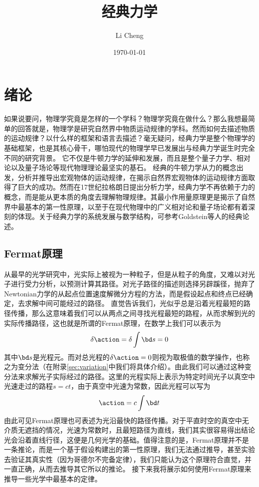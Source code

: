 \documentclass[12pt,openany]{book}
\title{经典力学}
\author{Li Cheng}
\date{\today}
\begin{document}
\maketitle
\frontmatter
\tableofcontents
\mainmatter

\chapter{绪论}
\label{chap:intro}
如果说要问，物理学究竟是怎样的一个学科？物理学究竟在做什么？那么我想最简单的回答就是，物理学是研究自然界中物质运动规律的学科。然而如何去描述物质的运动规律？以什么样的框架和语言去描述？毫无疑问，经典力学是整个物理学的基础框架，也是其核心骨干，哪怕现代的物理学早已发展出与经典力学诞生时完全不同的研究背景。
它不仅是牛顿力学的延伸和发展，而且是整个量子力学、相对论以及量子场论等现代物理理论最坚实的基石。
经典的牛顿力学从力的概念出发，分析并推导出宏观物体的运动规律，在揭示自然界宏观物体的运动规律方面取得了巨大的成功。然而在17世纪拉格朗日提出分析力学，经典力学不再依赖于力的概念，而是能从更本质的角度去理解物理规律。其最小作用量原理更是揭示了自然界中最基本的第一性原理，以至于在现代物理中的广义相对论和量子场论都有着深刻的体现。关于经典力学的系统发展与数学结构，可参考Goldstein等人的经典论述\cite{landau1976, goldstein2002}。


\section{Fermat原理}
\label{sec:fermat}

从最早的光学研究中，光实际上被视为一种粒子，但是从粒子的角度，又难以对光子进行受力分析，以预测计算其路径。对光子路径的描述则选择另辟蹊径，抛弃了Newtonian力学的从起点位置速度解微分方程的方法，而是假设起点和终点已经确定，去求解中间可能经过的路径。
直觉告诉我们，光似乎总是沿着光程最短的路径传播，那么这意味着我们可以从两点之间寻找光程最短的路程，从而求解到光的实际传播路径，这也就是所谓的Fermat原理，在数学上我们可以表示为
\begin{equation}
   \delta \action = \delta \int \bd s =0\label{eq:fermat}
\end{equation}
其中\(\bd s\)是光程元。而对总光程的$\delta\action=0$则视为取极值的数学操作，也称之为变分法（在附录\ref{sec:variation}中我们将具体介绍）。由此我们可以通过这种变分法来求解光子实际经过的路径。这里的光程实际上表示为特定时间光子以真空中光速走过的路程$s = ct$，由于真空中光速为常数，因此光程可以写为
\begin{equation}
   \action = c\int \bd t %
\end{equation}
由此可见Fermat原理也可表述为光沿最快的路径传播。对于平直时空的真空中无介质无遮挡的情况，光速为常数时，且最短路径为直线，我们其实很容易得出结论光会沿着直线行径，这便是几何光学的基础。值得注意的是，Fermat原理并不是一条推论，而是一个基于假设构建出的第一性原理，我们无法通过推导，甚至实验去验证其真实性（因为哥德尔不完备定律），我们只能认为这个原理符合直觉，并一直正确，从而去推导其它所以的推论。
接下来我将展示如何使用Fermat原理来推导一些光学中最基本的定律。
\end{document}
